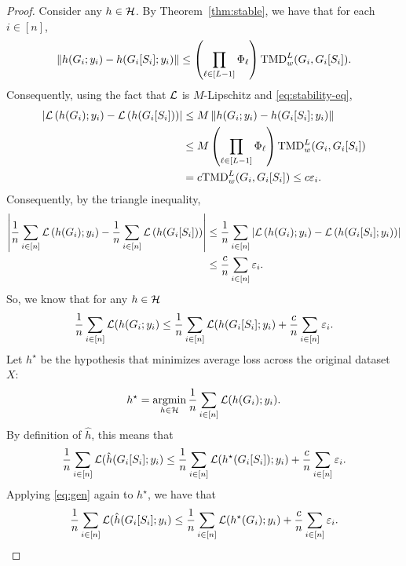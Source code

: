 \corrermfirst*
\begin{proof} Consider any $h \in \mathcal H$. By Theorem~\ref{thm:stable}, we have that for each $i \in [n]$, 
\begin{align}\label{eq:stability-eq}
    \left\lVert{h}(G_i; y_i) - {h}(G_i[S_i]; y_i)\right\rVert \leq \left(\prod_{\ell \in [L-1]} \Phi_\ell  \right ) \textnormal{TMD}_w^L(G_i, G_i[S_i]). 
\end{align}
Consequently, using the fact that $\mathcal L$ is $M$-Lipschitz and \eqref{eq:stability-eq}, 
\begin{align*}
    \left\lvert\mathcal L\left({h}(G_i); y_i \right ) - \mathcal L\left({h}(G_i[S_i]) \right )\right\rvert &\leq M \left\lVert{h}(G_i; y_i) - {h}(G_i[S_i]; y_i)\right\rVert \\
    &\leq M \left(\prod_{\ell \in [L-1]} \Phi_\ell  \right ) \textnormal{TMD}_w^L(G_i, G_i[S_i]) \\
    &= c \textnormal{TMD}_w^L(G_i, G_i[S_i]) \leq c\varepsilon_i. 
\end{align*}
Consequently, by the triangle inequality, 
\begin{align*}
    \left\lvert \frac{1}{n}\sum_{i \in [n]} \mathcal L\left({h}(G_i); y_i \right ) - \frac{1}{n}\sum_{i \in [n]} \mathcal L\left({h}(G_i[S_i]) \right )\right\rvert &\leq \frac{1}{n}\sum_{i \in [n]} \left\lvert\mathcal L\left({h}(G_i); y_i \right ) - \mathcal L\left({h}(G_i[S_i]; y_i) \right )\right\rvert \\
    &\leq \frac{c}{n}\sum_{i \in [n]} \varepsilon_i. 
\end{align*}
So, we know that for any $h \in \mathcal H$
\begin{align}\label{eq:gen}
    \frac{1}{n} \sum_{i \in [n]} \mathcal L({h}(G_i; y_i) \leq \frac{1}{n} \sum_{i \in [n]} \mathcal L(h({G_i[S_i]}; y_i) + \frac{c}{n} \sum_{i\in[n]} \varepsilon_i.
\end{align}
Let $h^\star$ be the hypothesis that minimizes average loss across the original dataset $X$: 
\begin{align*}
    h^\star = \operatorname*{argmin}_{h \in \mathcal H} \frac{1}{n} \sum_{i \in [n]} \mathcal L(h(G_i); y_i). 
\end{align*}
By definition of $\hat{h}$, this means that
\begin{align*}
    \frac{1}{n} \sum_{i \in [n]} \mathcal L(\hat{h}(G_i[S_i]; y_i) \leq \frac{1}{n} \sum_{i \in [n]} \mathcal L(h^\star(G_i[S_i]); y_i) + \frac{c}{n} \sum_{i \in [n]} \varepsilon_i. 
\end{align*}
Applying \eqref{eq:gen} again to $h^\star$, we have that 
\begin{align*}
    \frac{1}{n} \sum_{i \in [n]} \mathcal L(\hat{h}(G_i[S_i]; y_i) \leq  \frac{1}{n} \sum_{i \in [n]} \mathcal L(h^\star(G_i); y_i) + \frac{c}{n} \sum_{i \in [n]} \varepsilon_i. 
\end{align*}
\end{proof}

